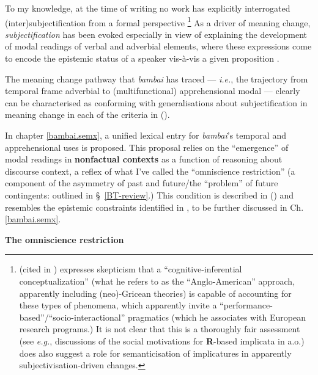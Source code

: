 \noindent To my knowledge, at the time of writing no work has explicitly interrogated (inter)subjectification from a formal perspective \citetext{\citeauthor{Eckardt2006} acknowledges this in her \citeyear{Eckardt2006} monograph (239).}\footnote{\citet{Jucker2012} (cited in \citealt[562]{Traugott2012}) expresses skepticism that a ``cognitive-inferential conceptualization'' (what he refers to as the ``Anglo-American'' approach, apparently including (neo)-Gricean theories) is capable of accounting for these types of phenomena, which apparently invite a ``performance-based''/``socio-interactional'' pragmatics (which he associates with European research programs.) It is not clear that this is a thoroughly fair assessment (see \textit{e.g.}, discussions of the social motivations for \textbf{R}-based implicata in \citealp{Horn1984,Horn1984a,Horn1993,Horn2007a} a.o.) \citet[43]{Eckardt2006} does also suggest a role for semanticisation of implicatures in apparently subjectivisation-driven changes.} As a driver of meaning change, \textit{subjectification} has been evoked especially in view of explaining the development of modal readings of verbal and adverbial elements, where these expressions come to encode the epistemic status of a speaker vis-à-vis a given proposition \citep{Finegan1995,Traugott1989,Traugott1995,Traugott2006,Traugott2003}.


 The meaning change pathway that \textit{bambai} has traced --- \textit{i.e.}, the trajectory from temporal frame adverbial to (multifunctional) apprehensional modal --- clearly can be characterised as conforming with generalisations about subjectification in meaning change in each of the criteria in ().

  In chapter \ref{bambai.semx}, a unified lexical entry for \textit{bambai}'s temporal and apprehensional uses is proposed. This proposal relies on the ``emergence'' of modal readings in \textbf{nonfactual contexts} as a function of reasoning about discourse context, a reflex of what I've called the ``omniscience restriction'' (a component of the asymmetry of past and future/the ``problem'' of future contingents: outlined in \S~\ref{BT-review}.) This condition is described in  () and resembles the epistemic constraints identified in \citet{Kaufmann2002}, to be further discussed in Ch. \ref{bambai.semx}.
  
  \ex\textbf{The omniscience restriction}
  
